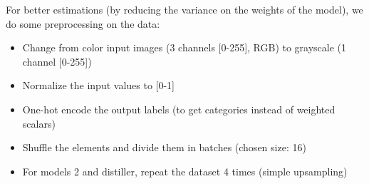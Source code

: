 For better estimations (by reducing the variance on the weights of the model),
we do some preprocessing on the data:
\begin{itemize}
    \item Change from color input images (3 channels [0-255], RGB) to grayscale (1 channel [0-255])
    \item Normalize the input values to [0-1]
    \item One-hot encode the output labels (to get categories instead of weighted scalars)
    \item Shuffle the elements and divide them in batches (chosen size: 16)
    \item For models 2 and distiller, repeat the dataset 4 times (simple upsampling) 
\end{itemize}